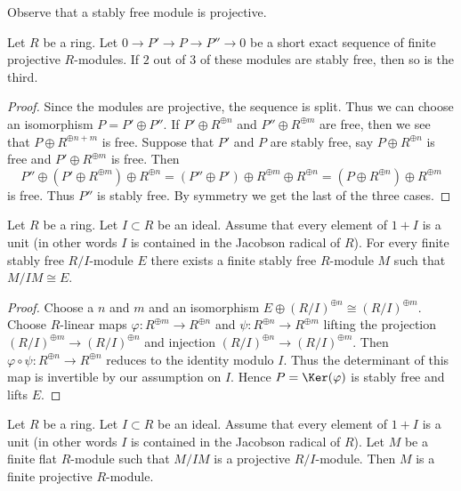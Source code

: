 \noindent
Observe that a stably free module is projective.

\begin{lemma}
\label{lemma-exact-category-stably-free}
Let $R$ be a ring. Let $0 \to P' \to P \to P'' \to 0$ be a short
exact sequence of finite projective $R$-modules. If $2$ out of $3$
of these modules are stably free, then so is the third.
\end{lemma}

\begin{proof}
Since the modules are projective, the sequence is split. Thus we can
choose an isomorphism $P = P' \oplus P''$. If $P' \oplus R^{\oplus n}$
and $P'' \oplus R^{\oplus m}$ are free, then we see that
$P \oplus R^{\oplus n + m}$ is free. Suppose that $P'$ and $P$ are
stably free, say $P \oplus R^{\oplus n}$ is free and $P' \oplus R^{\oplus m}$
is free. Then
$$
P'' \oplus (P' \oplus R^{\oplus m}) \oplus R^{\oplus n} =
(P'' \oplus P') \oplus R^{\oplus m} \oplus R^{\oplus n} =
(P \oplus R^{\oplus n}) \oplus R^{\oplus m}
$$
is free. Thus $P''$ is stably free. By symmetry we get the last of the
three cases.
\end{proof}

\begin{lemma}
\label{lemma-lift-stably-free}
Let $R$ be a ring. Let $I \subset R$ be an ideal. Assume that
every element of $1 + I$ is a unit (in other words $I$ is contained
in the Jacobson radical of $R$). For every finite stably free $R/I$-module $E$
there exists a finite stably free $R$-module $M$ such that $M/IM \cong E$.
\end{lemma}

\begin{proof}
Choose a $n$ and $m$ and an isomorphism
$E \oplus (R/I)^{\oplus n} \cong (R/I)^{\oplus m}$.
Choose $R$-linear maps $\varphi : R^{\oplus m} \to R^{\oplus n}$
and $\psi : R^{\oplus n} \to R^{\oplus m}$ lifting the
projection $(R/I)^{\oplus m} \to (R/I)^{\oplus n}$
and injection $(R/I)^{\oplus n} \to (R/I)^{\oplus m}$.
Then $\varphi \circ \psi : R^{\oplus n} \to R^{\oplus n}$
reduces to the identity modulo $I$. Thus the determinant of
this map is invertible by our assumption on $I$. Hence
$P = \Ker(\varphi)$ is stably free and lifts $E$.
\end{proof}

\begin{lemma}
\label{lemma-lift-projective}
Let $R$ be a ring. Let $I \subset R$ be an ideal.
Assume that every element of $1 + I$ is a unit
(in other words $I$ is contained in the Jacobson radical of $R$).
Let $M$ be a finite flat $R$-module such that
$M/IM$ is a projective $R/I$-module.
Then $M$ is a finite projective $R$-module.
\end{lemma}

